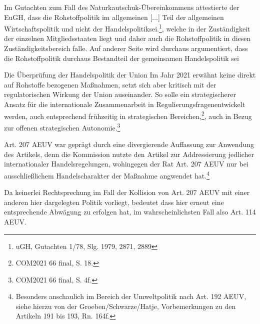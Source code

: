 \documentclass[12pt,a4paper,oneside]{book} %
\begin{document}
Im Gutachten zum Fall des Naturkautschuk-Übereinkommens attestierte der EuGH, dass die \glqq Rohstoffpolitik im allgemeinen [...] Teil der allgemeinen Wirtschaftspolitik und nicht der Handelspolitik\grqq sei.\footnote{ uGH, Gutachten 1/78, Slg. 1979, 2871, 2889}, welche in der Zuständigkeit der einzelnen Mitgliedsstaaten liegt und daher auch die Rohstoffpolitik in diesen Zuständigkeitsbereich falle. Auf anderer Seite wird durchaus argumentiert, dass die Rohstoffpolitik durchaus Bestandteil der gemeinsamen Handelspolitik sei\autocite{Benedek, Art. 179 EGV, Rn. 6, 2009, 40. Aufl.}

Die Überprüfung der Handelspolitik der Union Im Jahr 2021 erwähnt keine direkt auf Rohstoffe bezogenen Maßnahmen, setzt sich aber kritisch mit der regulatorischen Wirkung der Union auseinander. So solle ein \glqq strategischerer Ansatz für die internationale Zusammenarbeit in Regulierungsfragen\grqq entwickelt werden, auch entsprechend frühzeitig in strategischen Bereichen,\footnote{COM2021 66 final, S. 18.}, auch in Bezug zur offenen strategischen Autonomie.\footnote{COM2021 66 final, S. 4f.}
	
Art. 207 AEUV war geprägt durch eine divergierende Auffassung zur Anwendung des Artikels, denn die Kommission nutzte den Artikel zur Addressierung jedlicher internationaler Handelsregelungen, wohingegen der Rat Art. 207 AEUV nur bei ausschließlichem Handelscharakter der Maßnahme angwendet hat.\footnote{Besonders anschaulich im Bereich der Umweltpolitik nach Art. 192 AEUV, siehe hierzu von der Groeben/Schwarze/Hatje, Vorbemerkungen zu den Artikeln 191 bis 193, Rn. 164f.} 

	
Da keinerlei Rechtsprechung im Fall der Kollision von Art. 207 AEUV mit einer anderen hier dargelegten Politik vorliegt, bedeutet dass hier erneut eine entsprechende Abwägung zu erfolgen hat, im wahrscheinlichsten Fall also Art. 114 AEUV.
	
\end{document}

